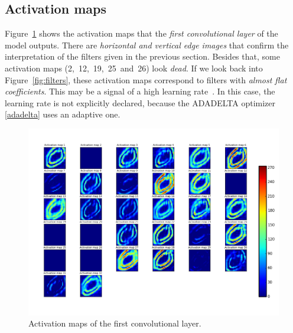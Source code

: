 \subsection{Activation maps}
Figure~\ref{fig:activation_maps} shows the activation maps that the \emph{first convolutional layer} of the model outputs. There are \emph{horizontal and vertical edge images} that confirm the interpretation of the filters given in the previous section. Besides that, some activation maps (2,~12,~19,~25~and~26) look \textit{dead}. If we look back into Figure~\ref{fig:filters}, these activation maps correspond to filters with \emph{almost flat coefficients}. This may be a signal of a high learning rate~\cite{cs231n}. In this case, the learning rate is not explicitly declared, because the ADADELTA optimizer \ref{adadelta} uses an adaptive one.
\begin{figure}
	\centering
	\includegraphics[width=0.9\linewidth, keepaspectratio]{figures/activation_maps_conv2d_1.png}
	\caption{Activation maps of the first convolutional layer.}
	\label{fig:activation_maps}
\end{figure}

